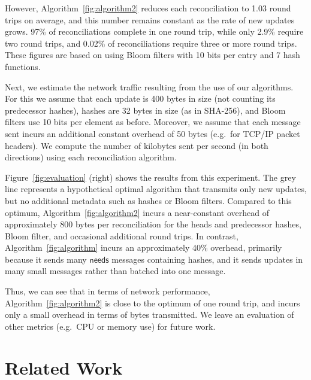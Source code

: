 \documentclass[a4paper,anonymous,USenglish]{lipics-v2019}
\begin{document}
However, Algorithm~\ref{fig:algorithm2} reduces each reconciliation to 1.03 round trips on average, and this number remains constant as the rate of new updates grows.
97\% of reconciliations complete in one round trip, while only 2.9\% require two round trips, and 0.02\% of reconciliations require three or more round trips.
These figures are based on using Bloom filters with 10 bits per entry and 7 hash functions.

Next, we estimate the network traffic resulting from the use of our algorithms.
For this we assume that each update is 400 bytes in size (not counting its predecessor hashes), hashes are 32 bytes in size (as in SHA-256), and Bloom filters use 10 bits per element as before.
Moreover, we assume that each message sent incurs an additional constant overhead of 50 bytes (e.g.\ for TCP/IP packet headers).
We compute the number of kilobytes sent per second (in both directions) using each reconciliation algorithm.

Figure~\ref{fig:evaluation} (right) shows the results from this experiment.
The grey line represents a hypothetical optimal algorithm that transmits only new updates, but no additional metadata such as hashes or Bloom filters.
Compared to this optimum, Algorithm~\ref{fig:algorithm2} incurs a near-constant overhead of approximately 800 bytes per reconciliation for the heads and predecessor hashes, Bloom filter, and occasional additional round trips.
In contrast, Algorithm~\ref{fig:algorithm} incurs an approximately 40\% overhead, primarily because it sends many $\mathsf{needs}$ messages containing hashes, and it sends updates in many small messages rather than batched into one message.

Thus, we can see that in terms of network performance, Algorithm~\ref{fig:algorithm2} is close to the optimum of one round trip, and incurs only a small overhead in terms of bytes transmitted.
We leave an evaluation of other metrics (e.g.\ CPU or memory use) for future work.

\section{Related Work}\label{sec:relwork}
\end{document}
